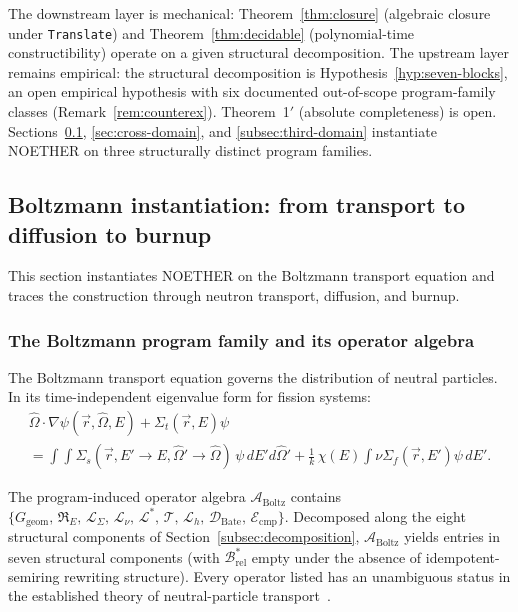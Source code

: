 \documentclass[acmsmall,screen,review]{acmart}
\begin{document}
The downstream layer is mechanical: Theorem~\ref{thm:closure} (algebraic closure under \texttt{Translate}) and Theorem~\ref{thm:decidable} (polynomial-time constructibility) operate on a given structural decomposition. The upstream layer remains empirical: the structural decomposition is Hypothesis~\ref{hyp:seven-blocks}, an open empirical hypothesis with six documented out-of-scope program-family classes (Remark~\ref{rem:counterex}). Theorem~1$'$ (absolute completeness) is open. Sections~\ref{sec:reactor}, \ref{sec:cross-domain}, and \ref{subsec:third-domain} instantiate NOETHER on three structurally distinct program families.



\subsection{Boltzmann instantiation: from transport to diffusion to burnup}
\label{sec:reactor}

This section instantiates NOETHER on the Boltzmann transport equation and traces the construction through neutron transport, diffusion, and burnup.

\subsubsection{The Boltzmann program family and its operator algebra}

The Boltzmann transport equation governs the distribution of neutral particles. In its time-independent eigenvalue form for fission systems:
\begin{multline}
\hat{\Omega}\!\cdot\!\nabla\psi(\vec{r},\hat{\Omega},E) + \Sigma_t(\vec{r},E)\psi \\
= \int\!\!\int \Sigma_s(\vec{r}, E'\!\to\!E,\hat{\Omega}'\!\to\!\hat{\Omega})\,\psi\,dE'd\hat{\Omega}'
+ \tfrac{1}{k}\,\chi(E)\!\!\int\!\nu\Sigma_f(\vec{r},E')\psi\,dE'.
\end{multline}

The program-induced operator algebra $\mathcal{A}_{\mathrm{Boltz}}$ contains $\{G_{\mathrm{geom}},\, \mathfrak{R}_E,\, \mathcal{L}_{\Sigma},\, \mathcal{L}_\nu,\, \mathcal{L}^*,\, \mathcal{T},\, \mathcal{L}_h,\, \mathcal{D}_{\mathrm{Bate}},\, \mathcal{E}_{\mathrm{cmp}}\}$. Decomposed along the eight structural components of Section~\ref{subsec:decomposition}, $\mathcal{A}_{\mathrm{Boltz}}$ yields entries in seven structural components (with $\mathcal{B}^{*}_{\mathrm{rel}}$ empty under the absence of idempotent-semiring rewriting structure). Every operator listed has an unambiguous status in the established theory of neutral-particle transport~\cite{BellGlasstone1970, LewisMiller1993}.
\end{document}
